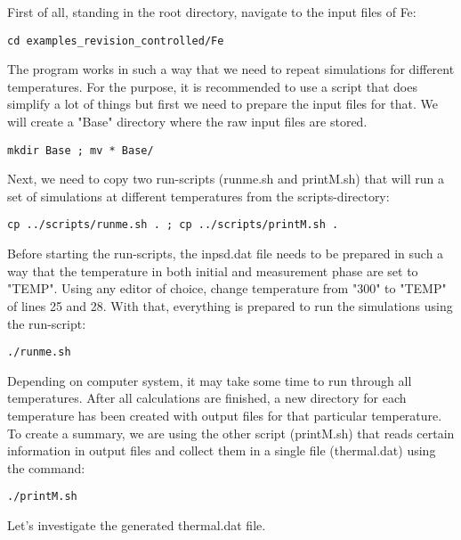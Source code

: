 \documentclass[11pt,fleqn,a4]{book} %
\begin{document}
First of all, standing in the root directory, navigate to the input files of Fe:
\begin{fBox} 
\begin{Verbatim}
cd examples_revision_controlled/Fe
\end{Verbatim}
\end{fBox}
The program works in such a way that we need to repeat simulations for different temperatures. For the purpose, it is recommended to use a script that does simplify a lot of things but first we need to prepare the input files for that. We will create a "Base" directory where the raw input files are stored.
\begin{fBox} 
\begin{Verbatim}
mkdir Base ; mv * Base/ 
\end{Verbatim}
\end{fBox}
Next, we need to copy two run-scripts (runme.sh and printM.sh)  that will run a set of simulations at different temperatures from the scripts-directory:
\begin{fBox} 
\begin{Verbatim}
cp ../scripts/runme.sh . ; cp ../scripts/printM.sh .
\end{Verbatim}
\end{fBox}
Before starting the run-scripts, the inpsd.dat file needs to be prepared in such a way that the temperature in both initial and measurement phase are set to "TEMP". Using any editor of choice, change temperature from "300" to "TEMP" of lines 25 and 28. With that, everything is prepared to run the simulations using the run-script:
\begin{fBox} 
\begin{Verbatim}
./runme.sh
\end{Verbatim}
\end{fBox}
Depending on computer system, it may take some time to run through all temperatures. After all calculations are finished, a new directory for each temperature has been created with output files for that particular temperature. To create a summary, we are using the other script (printM.sh) that reads certain information in output files and collect them in a single file (thermal.dat) using the command:
\begin{fBox} 
\begin{Verbatim}
./printM.sh
\end{Verbatim}
\end{fBox}
Let's investigate the generated thermal.dat file.
\end{document}
